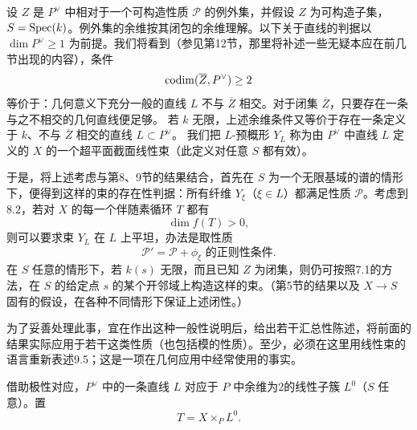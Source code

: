 设 $Z$ 是 $P^\vee$ 中相对于一个可构造性质 $\mathcal P$ 的例外集，并假设 $Z$ 为可构造子集，$S=\operatorname{Spec}(k)$。例外集的余维按其闭包的余维理解。以下关于直线的判据以 $\dim P^\vee\geq1$ 为前提。我们将看到（参见第12节，那里将补述一些无疑本应在前几节出现的内容），条件
\[
\operatorname{codim}(\overline Z,P^\vee)\geq2
\]
等价于：几何意义下充分一般的直线 $L$ 不与 $\overline Z$ 相交。对于闭集 $\overline Z$，只要存在一条与之不相交的几何直线便足够。
若 $k$ 无限，上述余维条件又等价于存在一条定义于 $k$、不与 $\overline Z$ 相交的直线 $L\subset P^\vee$。
我们把 $L$-预概形 $Y_L$ 称为由 $P^\vee$ 中直线 $L$ 定义的 $X$ 的一个超平面截面线性束（此定义对任意 $S$ 都有效）。

于是，将上述考虑与第8、9节的结果结合，首先在 $S$ 为一个无限基域的谱的情形下，便得到这样的束的存在性判据：所有纤维 $Y_\xi$（$\xi\in L$）都满足性质 $\mathcal P$。考虑到8.2，若对 $X$ 的每一个伴随素循环 $T$ 都有
\[
\dim f(T)>0,
\]
则可以要求束 $Y_L$ 在 $L$ 上平坦，办法是取性质
\[
\mathcal P'=\mathcal P+\text{$\phi_\xi$ 的正则性条件}.
\]
在 $S$ 任意的情形下，若 $k(s)$ 无限，而且已知 $Z$ 为闭集，则仍可按照7.1的方法，在 $S$ 的给定点 $s$ 的某个开邻域上构造这样的束。（第5节的结果以及 $X\to S$ 固有的假设，在各种不同情形下保证上述闭性。）

为了妥善处理此事，宜在作出这种一般性说明后，给出若干汇总性陈述，将前面的结果实际应用于若干这类性质（也包括模的性质）。至少，必须在这里用线性束的语言重新表述9.5；这是一项在几何应用中经常使用的事实。

借助极性对应，$P^\vee$ 中的一条直线 $L$ 对应于 $P$ 中余维为2的线性子簇 $L^0$（$S$ 任意）。置
\[
T=X\times_P L^0.
\]

